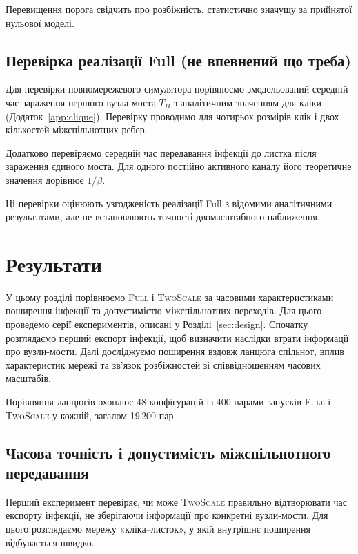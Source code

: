 \documentclass[a4paper,fleqn]{cas-sc}
\newcommand{\Full}{\textup{\textsc{Full}}}
\newcommand{\TS}{\textup{\textsc{TwoScale}}}
\begin{document}
Перевищення порога свідчить про розбіжність,
статистично значущу за прийнятої нульової
моделі. 






\subsection{Перевірка реалізації Full (не впевнений що треба)}

Для перевірки повномережевого симулятора
порівнюємо змодельований середній час
зараження першого вузла-моста $T_B$
з аналітичним значенням для кліки
(Додаток~\ref*{app:clique}).
Перевірку проводимо для чотирьох
розмірів клік і двох кількостей
міжспільнотних ребер.

Додатково перевіряємо середній час
передавання інфекції до листка
після зараження єдиного моста.
Для одного постійно активного каналу
його теоретичне значення дорівнює $1/\beta$.

Ці перевірки оцінюють узгодженість
реалізації Full з відомими аналітичними
результатами, але не встановлюють
точності двомасштабного наближення.









\section{Результати}
\label{sec:results}

У цьому розділі порівнюємо \Full{} і \TS{}
за часовими характеристиками поширення інфекції
та допустимістю міжспільнотних переходів.
Для цього проведемо серії експериментів, описані у Розділі~\ref{sec:design}.
Спочатку розглядаємо перший експорт інфекції,
щоб визначити наслідки втрати інформації
про вузли-мости. Далі досліджуємо поширення
вздовж ланцюга спільнот, вплив характеристик
мережі та зв'язок розбіжностей зі співвідношенням
часових масштабів.

Порівняння ланцюгів охоплює 48 конфігурацій
із 400 парами запусків \Full{} і \TS{} у кожній,
загалом 19\,200 пар.


\subsection{Часова точність і допустимість
міжспільнотного передавання}
\label{sec:res_clique}

Перший експеримент перевіряє, чи може \TS{}
правильно відтворювати час експорту інфекції,
не зберігаючи інформації про конкретні
вузли-мости. Для цього розглядаємо мережу
«кліка--листок», у якій внутрішнє поширення
відбувається швидко.
\end{document}
